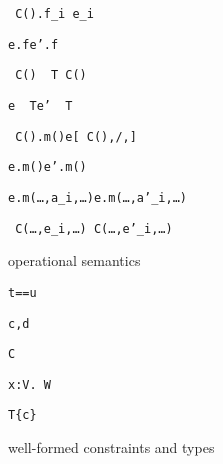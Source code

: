 \begin{figure*}
\begin{minipage}{.4\textwidth}
\quad{}
	{\tt\new~C().f_i \derives e_i}

	{\tt e.f\derives e'.f}

	{\tt\new~C()~\as~T\derives\new~C()}

	{\tt e~\as~T\derives e'~\as~T}

\end{minipage}%
\begin{minipage}{.6\textwidth}
\quad{}
	{\tt\new~C().m()\derives e[\new~C(),/\this,]}

	{\tt e.m()\derives e'.m()}

	{\tt e.m(\ldots,a_i,\ldots)\derives e.m(\ldots,a'_i,\ldots)}

	{\tt\new~C(\ldots,e_i,\ldots)\derives\new~C(\ldots,e'_i,\ldots)}
\end{minipage}
\caption{\FX{} operational semantics}
\label{fig:sos}
\end{figure*}


\begin{figure*}
\begin{minipage}{.4\textwidth}
\quad{}
\infax[W-True]
  {\vdash\true~\constraint}

	{\tt\Gamma\vdash t==u~\constraint} 

	{\tt\Gamma\vdash c,d~\constraint}

\end{minipage}%
\begin{minipage}{.6\textwidth}
\quad{}

	{\tt\vdash C~\type} 

	{\tt\Gamma\vdash\exists x:V.~W~\type} 

	{\tt\Gamma\vdash T\{c\}~\type} 
\end{minipage}
\caption{\FX{} well-formed constraints and types}
\label{fig:well}
\end{figure*}


